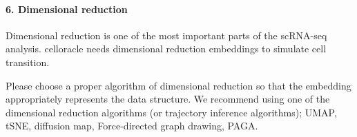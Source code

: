 \documentclass[letterpaper,10pt,english]{sphinxmanual}
\begin{document}
{
%
\begin{sphinxVerbatim}[commandchars=\\\{\}]
\llap{\color{nbsphinxin}[7]:\,\hspace{\fboxrule}\hspace{\fboxsep}}
  

\end{sphinxVerbatim}
}

{
%
\begin{sphinxVerbatim}[commandchars=\\\{\}]
\llap{\color{nbsphinxin}[8]:\,\hspace{\fboxrule}\hspace{\fboxsep}}

\end{sphinxVerbatim}
}


\paragraph{6. Dimensional reduction}
\label{\detokenize{notebooks/03_scRNA-seq_data_preprocessing/scanpy_preprocessing_with_Paul_etal_2015_data:6.-Dimensional-reduction}}
Dimensional reduction is one of the most important parts of the scRNA-seq analysis. celloracle needs dimensional reduction embeddings to simulate cell transition.

Please choose a proper algorithm of dimensional reduction so that the embedding appropriately represents the data structure. We recommend using one of the dimensional reduction algorithms (or trajectory inference algorithms); UMAP, tSNE, diffusion map, Force-directed graph drawing, PAGA.
\end{document}
